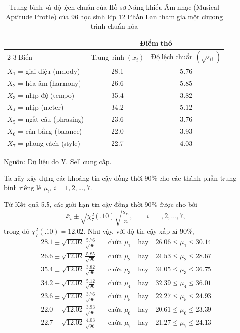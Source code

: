 \setcounter{table}{4}
\begin{table}[!htbp]
\centering
\caption{Trung bình và độ lệch chuẩn của Hồ sơ Năng khiếu Âm nhạc (Musical Aptitude Profile) của 96 học sinh lớp 12 Phần Lan tham gia một chương trình chuẩn hóa}
\label{tab:5-5}
\small
\begin{tabular}{@{}lcc@{}}
\toprule
 & \multicolumn{2}{c}{Điểm thô} \\
\cmidrule(lr){2-3}
Biến & Trung bình $(\bar{x}_i)$ & Độ lệch chuẩn $(\sqrt{s_{ii}})$ \\
\midrule
$X_1$ = giai điệu (melody)  & 28.1 & 5.76 \\
$X_2$ = hòa âm (harmony)    & 26.6 & 5.85 \\
$X_3$ = nhịp độ (tempo)     & 35.4 & 3.82 \\
$X_4$ = nhịp (meter)        & 34.2 & 5.12 \\
$X_5$ = ngắt câu (phrasing) & 23.6 & 3.76 \\
$X_6$ = cân bằng (balance)  & 22.0 & 3.93 \\
$X_7$ = phong cách (style)  & 22.7 & 4.03 \\
\bottomrule
\end{tabular}

\smallskip
{\footnotesize Nguồn: Dữ liệu do V. Sell cung cấp.\par}
\end{table}

Ta hãy xây dựng các khoảng tin cậy đồng thời $90\%$ cho các thành phần trung bình riêng lẻ $\mu_i$, $i=1,2,\dots,7$.

Từ Kết quả 5.5, các giới hạn tin cậy đồng thời \(90\%\) được cho bởi
\[
    \bar{x}_i \pm \sqrt{\chi_7^2(.10)}\sqrt{\frac{s_{ii}}{n}},
    \qquad i=1,2,\dots,7,
\]
trong đó \(\chi_7^2(.10)=12.02\). Như vậy, với độ tin cậy xấp xỉ \(90\%\),
\begin{align*}
    28.1 \pm \sqrt{12.02}\,\frac{5.76}{\sqrt{96}} &\quad \text{chứa } \mu_1 \quad \text{hay} \quad 26.06 \le \mu_1 \le 30.14 \\
    26.6 \pm \sqrt{12.02}\,\frac{5.85}{\sqrt{96}} &\quad \text{chứa } \mu_2 \quad \text{hay} \quad 24.53 \le \mu_2 \le 28.67 \\
    35.4 \pm \sqrt{12.02}\,\frac{3.82}{\sqrt{96}} &\quad \text{chứa } \mu_3 \quad \text{hay} \quad 34.05 \le \mu_3 \le 36.75 \\
    34.2 \pm \sqrt{12.02}\,\frac{5.12}{\sqrt{96}} &\quad \text{chứa } \mu_4 \quad \text{hay} \quad 32.39 \le \mu_4 \le 36.01 \\
    23.6 \pm \sqrt{12.02}\,\frac{3.76}{\sqrt{96}} &\quad \text{chứa } \mu_5 \quad \text{hay} \quad 22.27 \le \mu_5 \le 24.93 \\
    22.0 \pm \sqrt{12.02}\,\frac{3.93}{\sqrt{96}} &\quad \text{chứa } \mu_6 \quad \text{hay} \quad 20.61 \le \mu_6 \le 23.39 \\
    22.7 \pm \sqrt{12.02}\,\frac{4.03}{\sqrt{96}} &\quad \text{chứa } \mu_7 \quad \text{hay} \quad 21.27 \le \mu_7 \le 24.13
\end{align*}

